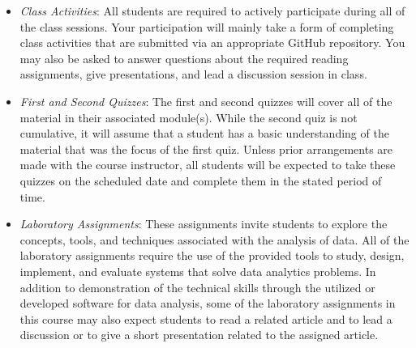 \documentclass[11pt]{article} %
\begin{document}
\begin{itemize}

  \item {\em Class Activities}: All students are required to actively participate during all of the class sessions. Your participation will mainly take a form of completing class activities that are submitted via an appropriate GitHub repository. You may also be asked to answer questions about the required reading assignments,  give presentations, and lead a discussion session in class.%



	
  \item {\em First and Second Quizzes}: The first and second quizzes will cover all of the material in their associated module(s). While the second quiz is not cumulative, it will assume that a student has a basic understanding of the material that was the focus of the first quiz. Unless prior arrangements are made with the course instructor, all students will be expected to take these quizzes on the scheduled date and complete them in the stated period of time.



  \item {\em Laboratory Assignments}: These assignments invite students to explore the concepts, tools, and techniques associated with the analysis of data.  All of the laboratory assignments require the use of the provided tools to study, design, implement, and evaluate systems that solve data analytics problems.  In addition to demonstration of the technical skills through the utilized or developed software for data analysis, some of the laboratory assignments in this course may also expect students to read a related article and to lead a discussion or to give  a short presentation related to the assigned article.
  

\end{itemize}
\end{document}
